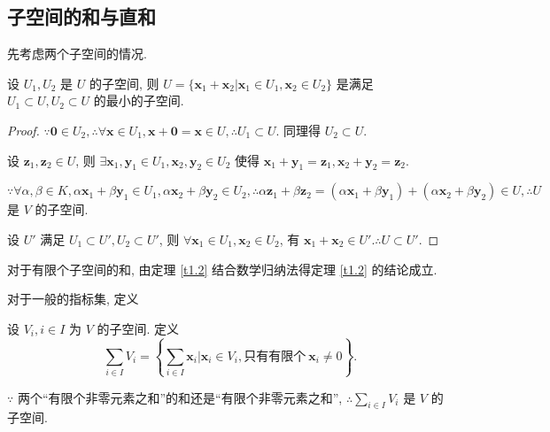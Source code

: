 \documentclass[color=black,device=normal,lang=cn,mode=geye]{elegantnote}
\begin{document}
\subsection{子空间的和与直和}
先考虑两个子空间的情况.
\begin{theorem}\label{t1.2}
    设 $U_1,U_2$ 是 $U$ 的子空间, 则 $U=\{\boldsymbol{x}_1+\boldsymbol{x}_2|\boldsymbol{x}_1\in U_1,\boldsymbol{x}_2\in U_2\}$ 是满足 $U_1\subset U,U_2\subset U$ 的最小的子空间.
\end{theorem}
\begin{proof}
    $\because\boldsymbol{0}\in U_2,\therefore\forall\boldsymbol{x}\in U_1,\boldsymbol{x}+\boldsymbol{0}=\boldsymbol{x}\in U,\therefore U_1\subset U$. 同理得 $U_2\subset U$.

    设 $\boldsymbol{z}_1,\boldsymbol{z}_2\in U$, 则 $\exists\boldsymbol{x}_1,\boldsymbol{y}_1\in U_1,\boldsymbol{x}_2,\boldsymbol{y}_2\in U_2$ 使得 $\boldsymbol{x}_1+\boldsymbol{y}_1=\boldsymbol{z}_1,\boldsymbol{x}_2+\boldsymbol{y}_2=\boldsymbol{z}_2$.

    $\because\forall\alpha,\beta\in K,\alpha\boldsymbol{x}_1+\beta\boldsymbol{y}_1\in U_1,\alpha\boldsymbol{x}_2+\beta\boldsymbol{y}_2\in U_2,\therefore\alpha\boldsymbol{z}_1+\beta\boldsymbol{z}_2=(\alpha\boldsymbol{x}_1+\beta\boldsymbol{y}_1)+(\alpha\boldsymbol{x}_2+\beta\boldsymbol{y}_2)\in U,\therefore U$ 是 $V$ 的子空间.

    设 $U'$ 满足 $U_1\subset U',U_2\subset U'$, 则 $\forall\boldsymbol{x}_1\in U_1,\boldsymbol{x}_2\in U_2$, 有 $\boldsymbol{x}_1+\boldsymbol{x}_2\in U'.\therefore U\subset U'$.
\end{proof}

对于有限个子空间的和, 由定理 \ref{t1.2} 结合数学归纳法得定理 \ref{t1.2} 的结论成立.

对于一般的指标集, 定义
\begin{definition}
    设 $V_i,i\in I$ 为 $V$ 的子空间. 定义
    \[\sum\limits_{i\in I}V_i=\left\{\sum\limits_{i\in I}\boldsymbol{x}_i\bigg|\boldsymbol{x}_i\in V_i,\text{只有有限个}\ \boldsymbol{x}_i\neq0\right\}.\]
\end{definition}

$\because$ 两个``有限个非零元素之和''的和还是``有限个非零元素之和'', $\therefore\sum\limits_{i\in I}V_i$ 是 $V$ 的子空间.
\end{document}
